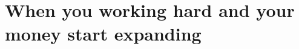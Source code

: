 \documentclass[12pt]{article}
\begin{document}
\section{When you working hard and your money start expanding}
\end{document}
